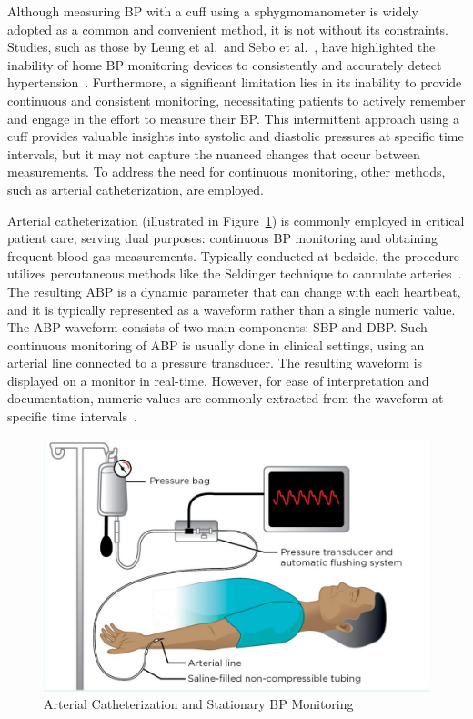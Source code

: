 Although measuring BP with a cuff using a sphygmomanometer is widely adopted as a common and convenient method, it is not without its constraints.
Studies, such as those by Leung et al.\ and Sebo et al.\ , have highlighted the inability of home BP monitoring devices to consistently and accurately detect hypertension~\cite{leungHypertensionCanada20162016, seboBloodPressureMeasurements2014}.
Furthermore, a significant limitation lies in its inability to provide continuous and consistent monitoring, necessitating patients to actively remember and engage in the effort to measure their BP\@.
This intermittent approach using a cuff provides valuable insights into systolic and diastolic pressures at specific time intervals, but it may not capture the nuanced changes that occur between measurements.
To address the need for continuous monitoring, other methods, such as arterial catheterization, are employed.

Arterial catheterization (illustrated in Figure~\ref{fig:catheter}) is commonly employed in critical patient care, serving dual purposes: continuous BP monitoring and obtaining frequent blood gas measurements.
Typically conducted at bedside, the procedure utilizes percutaneous methods like the Seldinger technique to cannulate arteries~\cite{clarkArterialCatheterization1992}.
The resulting \ac{ABP} is a dynamic parameter that can change with each heartbeat, and it is typically represented as a waveform rather than a single numeric value.
The ABP waveform consists of two main components: \ac{SBP} and \ac{DBP}.
Such continuous monitoring of ABP is usually done in clinical settings, using an arterial line connected to a pressure transducer.
The resulting waveform is displayed on a monitor in real-time.
However, for ease of interpretation and documentation, numeric values are commonly extracted from the waveform at specific time intervals~\cite{hillImputationContinuousArterial2021}.

\begin{figure}[h]
    \centering
    \includegraphics[scale=0.4]{images/abp/catheter}
    \caption{Arterial Catheterization and Stationary BP Monitoring~\cite{contributorEssentialCriticalCare2021}}
    \label{fig:catheter}
\end{figure}

